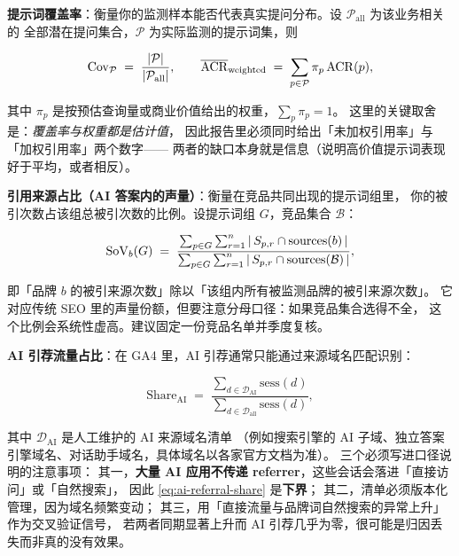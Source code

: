 \textbf{提示词覆盖率}：衡量你的监测样本能否代表真实提问分布。设 $\mathcal{P}_{\text{all}}$ 为该业务相关的
全部潜在提问集合，$\mathcal{P}$ 为实际监测的提示词集，则

\begin{equation}
\mathrm{Cov}_{\mathcal{P}} \;=\; \frac{\left\lvert \mathcal{P} \right\rvert}{\left\lvert \mathcal{P}_{\text{all}} \right\rvert} ,
\qquad
\overline{\mathrm{ACR}}_{\text{weighted}} \;=\; \sum_{p \in \mathcal{P}} \pi_p \, \mathrm{ACR}(p) ,
\label{eq:prompt-coverage}
\end{equation}

其中 $\pi_p$ 是按预估查询量或商业价值给出的权重，$\sum_p \pi_p = 1$。
这里的关键取舍是：\emph{覆盖率与权重都是估计值}，
因此报告里必须同时给出「未加权引用率」与「加权引用率」两个数字——
两者的缺口本身就是信息（说明高价值提示词表现好于平均，或者相反）。

\textbf{引用来源占比（AI 答案内的声量）}：衡量在竞品共同出现的提示词组里，
你的被引次数占该组总被引次数的比例。设提示词组 $G$，竞品集合 $\mathcal{B}$：

\begin{equation}
\mathrm{SoV}_b(G) \;=\; \frac{\sum_{p \in G}\sum_{r=1}^{n} \left\lvert \,S_{p,r} \cap \mathrm{sources}(b)\, \right\rvert}
{\sum_{p \in G}\sum_{r=1}^{n} \left\lvert \,S_{p,r} \cap \mathrm{sources}(\mathcal{B})\, \right\rvert} ,
\label{eq:share-of-voice}
\end{equation}

即「品牌 $b$ 的被引来源次数」除以「该组内所有被监测品牌的被引来源次数」。
它对应传统 SEO 里的声量份额，但要注意分母口径：如果竞品集合选得不全，
这个比例会系统性虚高。建议固定一份竞品名单并季度复核。

\textbf{AI 引荐流量占比}：在 GA4 里，AI 引荐通常只能通过来源域名匹配识别：

\begin{equation}
\mathrm{Share}_{\mathrm{AI}} \;=\;
\frac{\sum_{d \in \mathcal{D}_{\mathrm{AI}}} \mathrm{sess}(d)}
{\sum_{d \in \mathcal{D}_{\text{all}}} \mathrm{sess}(d)} ,
\label{eq:ai-referral-share}
\end{equation}

其中 $\mathcal{D}_{\mathrm{AI}}$ 是人工维护的 AI 来源域名清单
（例如搜索引擎的 AI 子域、独立答案引擎域名、对话助手域名，具体域名以各家官方文档为准）。
三个必须写进口径说明的注意事项：
其一，\textbf{大量 AI 应用不传递 referrer}，这些会话会落进「直接访问」或「自然搜索」，
因此 \cref{eq:ai-referral-share} 是\textbf{下界}；
其二，清单必须版本化管理，因为域名频繁变动；
其三，用「直接流量与品牌词自然搜索的异常上升」作为交叉验证信号，
若两者同期显著上升而 AI 引荐几乎为零，很可能是归因丢失而非真的没有效果。

